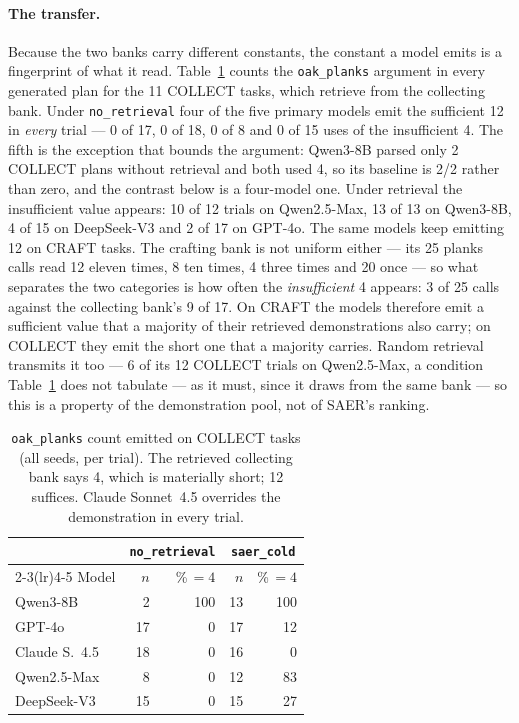 \documentclass[letterpaper]{article} %
\begin{document}
\paragraph{The transfer.}  Because the two banks carry different
constants, the constant a model emits is a fingerprint of what it read.
Table~\ref{tab:quantity} counts the \texttt{oak\_planks} argument in
every generated plan for the 11 COLLECT tasks, which retrieve from the
collecting bank.  Under \texttt{no\_retrieval} four of the five primary
models emit the sufficient 12 in \emph{every} trial --- 0 of 17, 0 of
18, 0 of 8 and 0 of 15 uses of the insufficient 4.  The fifth is the
exception that bounds the argument: Qwen3-8B parsed only 2 COLLECT plans
without retrieval and both used 4, so its baseline is 2/2 rather than
zero, and the contrast below is a four-model one.  Under retrieval the
insufficient value appears: 10 of 12 trials on Qwen2.5-Max, 13 of 13 on
Qwen3-8B, 4 of 15 on DeepSeek-V3 and 2 of 17 on GPT-4o.  The same models keep emitting 12 on
CRAFT tasks.  The crafting bank is not uniform either --- its 25 planks calls
read 12 eleven times, 8 ten times, 4 three times and 20 once --- so what
separates the two categories is how often the \emph{insufficient} 4 appears:
3 of 25 calls against the collecting bank's 9 of 17.  On CRAFT the models
therefore emit a sufficient value that a majority of their retrieved
demonstrations also carry; on COLLECT they emit the short one that a majority
carries.  Random retrieval transmits it too --- 6 of its 12 COLLECT trials on
Qwen2.5-Max, a condition Table~\ref{tab:quantity} does not tabulate --- as it
must, since it
draws from the same bank --- so this is a property of the demonstration pool,
not of SAER's ranking.

\begin{table}[htbp]
\centering
\caption{\texttt{oak\_planks} count emitted on COLLECT tasks (all seeds,
per trial).  The retrieved collecting bank says 4, which is materially
short; 12 suffices.  Claude Sonnet~4.5 overrides the demonstration in
every trial.}
\label{tab:quantity}
\small
\begin{tabular}{lrrrr}
\toprule
& \multicolumn{2}{c}{\texttt{no\_retrieval}} & \multicolumn{2}{c}{\texttt{saer\_cold}} \\
\cmidrule(lr){2-3}\cmidrule(lr){4-5}
Model & $n$ & \%\,$=4$ & $n$ & \%\,$=4$ \\
\midrule
Qwen3-8B      &  2 & 100 & 13 & 100 \\
GPT-4o        & 17 &   0 & 17 & 12 \\
Claude S.~4.5 & 18 &   0 & 16 &  0 \\
Qwen2.5-Max   &  8 &   0 & 12 & 83 \\
DeepSeek-V3   & 15 &   0 & 15 & 27 \\
\bottomrule
\end{tabular}
\end{table}
\end{document}
